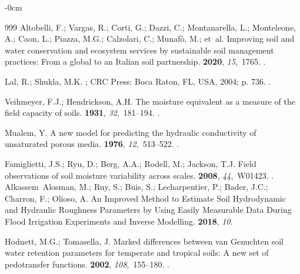 \documentclass[land,review,accept,pdftex,oneauthor]{Definitions/mdpi}
\begin{document}
\begin{adjustwidth}{-\extralength}{0cm}
\begin{thebibliography}{999}
Altobelli, F.; Vargas, R.; Corti, G.; Dazzi, C.; Montanarella, L.; Monteleone,
  A.; Caon, L.; Piazza, M.G.; Calzolari, C.; Munaf{\`o}, M.;  et~al.
\newblock Improving soil and water conservation and ecosystem services by
  sustainable soil management practices: From a global to an Italian soil
  partnership.
 {\bf 2020}, {\em 15},~1765.
.

Lal, R.; Shukla, M.K.
; CRC Press:  Boca Raton, FL, USA, %
  2004; p. 736.
.

Veihmeyer, F.J.; Hendrickson, A.H.
\newblock The moisture equivalent as a measure of the field capacity of soils.
 {\bf 1931}, {\em 32},~181--194.
.

Mualem, Y.
\newblock A new model for predicting the hydraulic conductivity of unsaturated
  porous media.
 {\bf 1976}, {\em 12},~513--522.
.

Famiglietti, J.S.; Ryu, D.; Berg, A.A.; Rodell, M.; Jackson, T.J.
\newblock Field observations of soil moisture variability across scales.
 {\bf 2008}, {\em 44},~W01423.
.
Alkassem~Alosman, M.; Ruy, S.; Buis, S.; Lecharpentier, P.; Bader, J.C.;
  Charron, F.; Olioso, A.
\newblock An Improved Method to Estimate Soil Hydrodynamic and Hydraulic
  Roughness Parameters by Using Easily Measurable Data During Flood Irrigation
  Experiments and Inverse Modelling.
 {\bf 2018}, {\em 10}.

Hodnett, M.G.; Tomasella, J.
\newblock Marked differences between van Genuchten soil water retention
  parameters for temperate and tropical soils: A new set of pedotransfer
  functions.
 {\bf 2002}, {\em 108},~155--180.
.


\end{thebibliography}
\end{adjustwidth}
\end{document}

